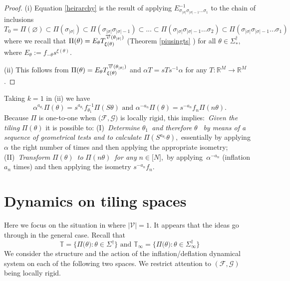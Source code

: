 \documentclass{amsproc}
\theoremstyle{plain}
\theoremstyle{definition}
\numberwithin{equation}{section}
\begin{document}
\begin{proof}
(i) Equation \ref{heirarchy} is the result of applying $E_{\sigma_{\left%
\vert \sigma\right\vert }\sigma_{\left\vert \sigma\right\vert
-1}...\sigma_{1}}^{-1}$ to the chain of inclusions 
\begin{equation*}
T_{0}=\Pi(\varnothing)\subset\Pi(\sigma_{\left\vert \sigma\right\vert
})\subset\Pi(\sigma_{\left\vert \sigma\right\vert }\sigma_{\left\vert
\sigma\right\vert -1})\subset...\subset\Pi(\sigma_{\left\vert \sigma
\right\vert }\sigma_{\left\vert \sigma\right\vert -1}...\sigma_{2})\subset
\Pi(\sigma_{\left\vert \sigma\right\vert }\sigma_{\left\vert
\sigma\right\vert -1}...\sigma_{1})
\end{equation*}
where we recall that $\Pi(\theta)=E_{\theta}T_{\xi(\theta)}^{\overrightarrow{%
\upsilon}(\theta_{\left\vert \theta\right\vert })}$ (Theorem \ref{piusingts}%
) for all $\theta\in\Sigma_{\ast}^{\dag},$ where $E_{\theta
}:=f_{-\theta}s^{\xi(\theta)}$.

(ii) This follows from $\Pi(\theta)=E_{\theta}T_{\xi(\theta)}^{%
\overrightarrow{\upsilon}(\theta_{\left\vert \theta\right\vert })}$ and $%
\alpha T=sTs^{-1}\alpha$ for any $T:\mathbb{R}^{M}\rightarrow\mathbb{R}^{M}$.
\end{proof}

Taking $k=1$ in (ii) we have%
\begin{equation*}
\alpha^{a_{\theta_{1}}}\Pi(\theta)=s^{a_{\theta_{1}}}f_{\theta_{1}}^{-1}%
\Pi(S\theta)\text{ and }\alpha^{-a_{n}}\Pi(\theta)=s^{-a_{n}}f_{n}\Pi
(n\theta)\text{.}
\end{equation*}
Because $\Pi$ is one-to-one when $(\mathcal{F},\mathcal{G)}$ is locally
rigid, this implies:\ \textit{Given the tiling }$\Pi(\theta)$ it is possible
to: (I)\textit{\ Determine }$\theta_{1}$\textit{\ and therefore }$\theta$%
\textit{\ by means of a sequence of geometrical tests and to calculate }$%
\Pi(S^{a_{\theta _{1}}}\theta),$ essentially by applying $\alpha$ the right
number of times and then applying the appropriate isometry; (II)\textit{\
Transform }$\Pi(\theta )$\textit{\ to }$\Pi(n\theta)$\textit{\ for any }$%
n\in\lbrack N]$,\textit{\ }by applying\textit{\ }$\alpha^{-a_{n}}$
(inflation $a_{n}$ times) and then applying the isometry $s^{-a_{n}}f_{n}$.

\section{Dynamics on tiling spaces}

Here we focus on the situation in \cite{barnsleyvince} where $\left\vert 
\mathcal{V}\right\vert =1$. It appears that the ideas go through in the
general case. Recall that 
\begin{equation*}
\mathbb{T}=\{\Pi(\mathbb{\theta)}:\theta\in\Sigma^{\dag}\}\text{ and }%
\mathbb{T}_{\infty}=\{\Pi(\mathbb{\theta)}:\theta\in\Sigma_{\infty}^{\dag}\}
\end{equation*}
We consider the structure and the action of the inflation/deflation
dynamical system on each of the following two spaces. We restrict attention
to $\left( \mathcal{F},\mathcal{G}\right) $ being locally rigid.
\end{document}
